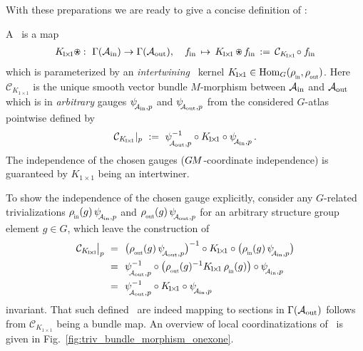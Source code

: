With these preparations we are ready to give a concise definition of \onexoneGMs:
\begin{dfn}[\onexoneGM]
\label{dfn:onexone}
    A \onexoneGM\ is a map
    \begin{align}
        K_{\!1\!\times\!1} \ostar :\ \Gamma(\Ain) \to \Gamma(\Aout),\ \ \ 
        \fin \,\mapsto\, K_{\!1\!\times\!1} \,\ostar\, \fin \,:=\, \mathcal{C}_{K_{\!1\!\times\!1}}\! \circ \fin
    \end{align}
    which is parameterized by an \emph{intertwining} \onexoneGM\ kernel $K_{\!1\!\times\!1} \in \Hom_G(\rhoin,\rhoout)$.
    Here $\mathcal{C}_{K_{\!1\!\times\!1}}$ is the unique smooth vector bundle $M$-morphism between $\mathcal{A}_\textup{in}$ and $\mathcal{A}_\textup{out}$ which is in \emph{arbitrary} gauges $\psiAinp$ and $\psiAoutp$ from the considered $G$-atlas pointwise defined by
    \begin{align}
        \mathcal{C}_{K_{\!1\!\times\!1}}|_p\ :=\ \psiAoutp^{-1} \circ K_{\!1\!\times\!1} \circ \psiAinp \,.
    \end{align}
    The independence of the chosen gauges ($G\mkern-1.4muM$-coordinate independence) is guaranteed by $K_{\!1\!\times\!1}$ being an intertwiner.
\end{dfn}
To show the independence of the chosen gauge explicitly, consider any $G$-related trivializations $\rhoin(g)\,\psiAinp$ and $\rhoout(g)\,\psiAoutp$ for an arbitrary structure group element $g\in G$, which leave the construction of
\begin{align}
    \mathcal{C}_{K_{\!1\!\times\!1}} \mkern-2mu\big|_p\ 
    =\ \ &\big(\rhoout(g)\, \psiAoutp \big)^{-1} \circ K_{\!1\!\times\!1} \circ \big(\rhoin(g)\, \psiAinp\big) \notag \\
    =\ \ &\psiAoutp^{-1} \circ \big( \rhoout(g)^{-1} K_{\!1\!\times\!1}\, \rhoin(g) \big) \circ \psiAinp \notag \\
    =\ \ &\psiAoutp^{-1} \circ K_{\!1\!\times\!1} \circ \psiAinp
\end{align}
invariant.
That such defined \onexoneGMs\ are indeed mapping to sections in $\Gamma(\mathcal{A}_\textup{out})$ follows from $\mathcal{C}_{K_{\!1\!\times\!1}}$ being a bundle map.
An overview of local coordinatizations of \onexoneGMs\ is given in Fig.~\ref{fig:triv_bundle_morphism_onexone}.

